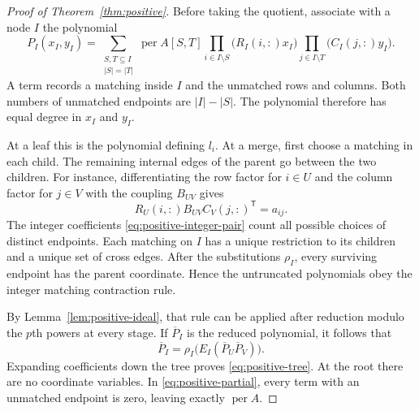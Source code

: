 \documentclass[11pt,reqno]{amsart}
\theoremstyle{remark}
\numberwithin{equation}{section}
\newcommand{\per}{\operatorname{per}}
\begin{document}
\begin{proof}[Proof of Theorem~\ref{thm:positive}]
Before taking the quotient, associate with a node $I$ the polynomial
\begin{equation}\label{eq:positive-partial}
 P_I(x_I,y_I)=
 \sum_{\substack{S,T\subseteq I\\ |S|=|T|}}
 \per A[S,T]
 \prod_{i\in I\setminus S}\bigl(R_I(i,:)x_I\bigr)
 \prod_{j\in I\setminus T}\bigl(C_I(j,:)y_I\bigr).
\end{equation}
A term records a matching inside $I$ and the unmatched rows and
columns. Both numbers of unmatched endpoints are $|I|-|S|$.
The polynomial therefore has equal degree in $x_I$ and $y_I$.

At a leaf this is the polynomial defining $l_i$. At a merge, first
choose a matching in each child. The remaining internal edges of the
parent go between the two children. For instance, differentiating
the row factor for $i\in U$ and the column factor for $j\in V$
with the coupling $B_{UV}$ gives
\[
 R_U(i,:)B_{UV}C_V(j,:)^{\mathsf T}=a_{ij}.
\]
The integer coefficients \eqref{eq:positive-integer-pair} count all possible
choices of distinct endpoints. Each matching on $I$ has a unique
restriction to its children and a unique set of cross edges. After
the substitutions $\rho_I$, every surviving endpoint has the parent
coordinate. Hence the untruncated polynomials obey the integer
matching contraction rule.

By Lemma~\ref{lem:positive-ideal}, that rule can be applied after reduction modulo
the $p$th powers at every stage. If $\overline P_I$ is the reduced
polynomial, it follows that
\[
 \overline P_I=\rho_I\bigl(E_I(\overline P_U\overline P_V)\bigr).
\]
Expanding coefficients down the tree proves \eqref{eq:positive-tree}.
At the root there are no coordinate variables. In \eqref{eq:positive-partial},
every term with an unmatched endpoint is zero, leaving exactly
$\per A$.


\end{proof}
\end{document}
